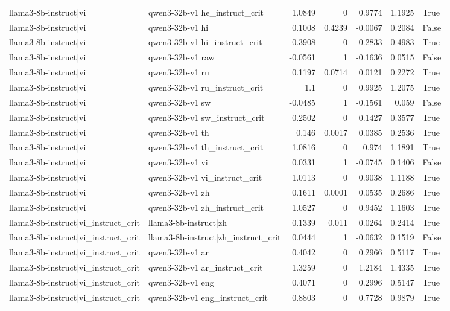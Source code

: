 \begin{table}
\begin{tabular}{l l r r r r l}
llama3-8b-instruct|vi & qwen3-32b-v1|he_instruct_crit & 1.0849 & 0 & 0.9774 & 1.1925 & True \\
llama3-8b-instruct|vi & qwen3-32b-v1|hi & 0.1008 & 0.4239 & -0.0067 & 0.2084 & False \\
llama3-8b-instruct|vi & qwen3-32b-v1|hi_instruct_crit & 0.3908 & 0 & 0.2833 & 0.4983 & True \\
llama3-8b-instruct|vi & qwen3-32b-v1|raw & -0.0561 & 1 & -0.1636 & 0.0515 & False \\
llama3-8b-instruct|vi & qwen3-32b-v1|ru & 0.1197 & 0.0714 & 0.0121 & 0.2272 & True \\
llama3-8b-instruct|vi & qwen3-32b-v1|ru_instruct_crit & 1.1 & 0 & 0.9925 & 1.2075 & True \\
llama3-8b-instruct|vi & qwen3-32b-v1|sw & -0.0485 & 1 & -0.1561 & 0.059 & False \\
llama3-8b-instruct|vi & qwen3-32b-v1|sw_instruct_crit & 0.2502 & 0 & 0.1427 & 0.3577 & True \\
llama3-8b-instruct|vi & qwen3-32b-v1|th & 0.146 & 0.0017 & 0.0385 & 0.2536 & True \\
llama3-8b-instruct|vi & qwen3-32b-v1|th_instruct_crit & 1.0816 & 0 & 0.974 & 1.1891 & True \\
llama3-8b-instruct|vi & qwen3-32b-v1|vi & 0.0331 & 1 & -0.0745 & 0.1406 & False \\
llama3-8b-instruct|vi & qwen3-32b-v1|vi_instruct_crit & 1.0113 & 0 & 0.9038 & 1.1188 & True \\
llama3-8b-instruct|vi & qwen3-32b-v1|zh & 0.1611 & 0.0001 & 0.0535 & 0.2686 & True \\
llama3-8b-instruct|vi & qwen3-32b-v1|zh_instruct_crit & 1.0527 & 0 & 0.9452 & 1.1603 & True \\
llama3-8b-instruct|vi_instruct_crit & llama3-8b-instruct|zh & 0.1339 & 0.011 & 0.0264 & 0.2414 & True \\
llama3-8b-instruct|vi_instruct_crit & llama3-8b-instruct|zh_instruct_crit & 0.0444 & 1 & -0.0632 & 0.1519 & False \\
llama3-8b-instruct|vi_instruct_crit & qwen3-32b-v1|ar & 0.4042 & 0 & 0.2966 & 0.5117 & True \\
llama3-8b-instruct|vi_instruct_crit & qwen3-32b-v1|ar_instruct_crit & 1.3259 & 0 & 1.2184 & 1.4335 & True \\
llama3-8b-instruct|vi_instruct_crit & qwen3-32b-v1|eng & 0.4071 & 0 & 0.2996 & 0.5147 & True \\
llama3-8b-instruct|vi_instruct_crit & qwen3-32b-v1|eng_instruct_crit & 0.8803 & 0 & 0.7728 & 0.9879 & True \\

\end{tabular}
\end{table}
